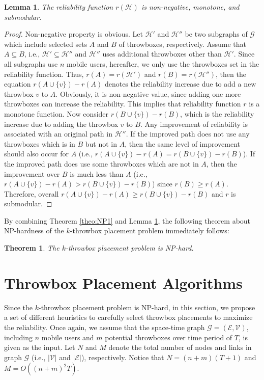\documentclass[10pt,conference,compsocconf,letterpaper]{IEEEtran}
\newtheorem{Lemma}{Lemma}
\newtheorem{Theorem}{Theorem}
\begin{document}
\begin{Lemma}
\label{lem:sub} The reliability  function $r(\mathcal{H})$ is non-negative, monotone, and submodular.
\end{Lemma}
\begin{proof}
Non-negative property is obvious.  Let $\mathcal{H'}$ and $\mathcal{H''}$ be two subgraphs of $\mathcal{G}$ which include
selected sets $A$ and $B$ of throwboxes, respectively. Assume that $A\subseteq B$, i.e., $\mathcal{H'} \subseteq \mathcal{H''}$
and $\mathcal{H''}$ uses additional throwboxes other than $\mathcal{H'}$. Since all subgraphs use $n$ mobile users,
hereafter, we only use the throwboxes set in the reliability function. Thus,  $r(A)=r(\mathcal{H'})$ and $r(B)=r(\mathcal{H''})$, then
the equation $r(A \cup \{v\})-r(A)$ denotes the reliability increase due to add a new throwbox $v$ to $A$. Obviously,
it is non-negative value, since adding one more throwboxes can increase the reliability. This implies that reliability  function $r$ is a monotone function. Now consider $r(B \cup \{v\})-r(B)$, which is the reliability increase due to adding the throwbox $v$ to $B$. Any improvement of reliability is associated with an original path in $\mathcal{H''}$. If the improved path does not use any throwboxes
which is in $B$ but not in $A$, then the same level of improvement should also occur for $A$ (i.e., $r(A \cup \{v\})-r(A)=r(B \cup \{v\})-r(B)$).
If the improved path does use some throwboxes which are not in $A$, then the improvement over $B$ is much less than $A$  (i.e., $r(A \cup \{v\})-r(A) > r(B \cup \{v\})-r(B)$) since $r(B) \ge r(A)$. Therefore, overall $r(A \cup \{v\})-r(A) \ge r(B \cup \{v\})-r(B)$ and $r$ is submodular.
\end{proof}

By combining Theorem \ref{theo:NP1} and Lemma \ref{lem:sub}, the following theorem about NP-hardness of the $k$-throwbox placement problem immediately
follows:
\begin{Theorem} \label{theo:NP-k}
The \emph{$k$-throwbox placement problem} is NP-hard.
\end{Theorem}

\section{Throwbox Placement Algorithms}
\label{sec:algorithm}

Since the $k$-throwbox placement problem is NP-hard, in this section, we propose a set of different heuristics to carefully select throwbox placements to maximize the reliability. Once again, we assume that the space-time graph $\mathcal{G}=(\mathcal{E},\mathcal{V})$, including $n$ mobile users and $m$ potential throwboxes over time period of $T$, is given as the input. Let $N$ and $M$ denote the total number of nodes and links in graph $\mathcal{G}$ (i.e., $|\mathcal{V}|$ and $|\mathcal{E}|$), respectively. Notice that $N=(n+m)(T+1)$ and $M=O((n+m)^2T)$.
\end{document}
